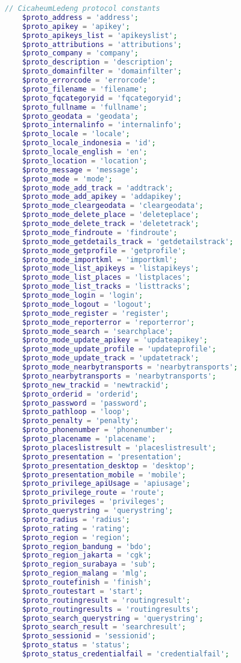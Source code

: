 \begin{lstlisting}[language=PHP,basicstyle=\tiny,caption=constants.php,label={lst:constants.php}]
	// CicaheumLedeng protocol constants
	$proto_address = 'address';
	$proto_apikey = 'apikey';
	$proto_apikeys_list = 'apikeyslist';
	$proto_attributions = 'attributions';	
	$proto_company = 'company';
	$proto_description = 'description';
	$proto_domainfilter = 'domainfilter';
	$proto_errorcode = 'errorcode';
	$proto_filename = 'filename';
	$proto_fqcategoryid = 'fqcategoryid';
	$proto_fullname = 'fullname';
	$proto_geodata = 'geodata';
	$proto_internalinfo = 'internalinfo';
	$proto_locale = 'locale';
	$proto_locale_indonesia = 'id';
	$proto_locale_english = 'en';
	$proto_location = 'location';
	$proto_message = 'message';
	$proto_mode = 'mode';
	$proto_mode_add_track = 'addtrack';
	$proto_mode_add_apikey = 'addapikey';
	$proto_mode_cleargeodata = 'cleargeodata';
	$proto_mode_delete_place = 'deleteplace';
	$proto_mode_delete_track = 'deletetrack';
	$proto_mode_findroute = 'findroute';
	$proto_mode_getdetails_track = 'getdetailstrack';
	$proto_mode_getprofile = 'getprofile';
	$proto_mode_importkml = 'importkml';
	$proto_mode_list_apikeys = 'listapikeys';
	$proto_mode_list_places = 'listplaces';
	$proto_mode_list_tracks = 'listtracks';
	$proto_mode_login = 'login';
	$proto_mode_logout = 'logout';
	$proto_mode_register = 'register';
	$proto_mode_reporterror = 'reporterror';
	$proto_mode_search = 'searchplace';
	$proto_mode_update_apikey = 'updateapikey';
	$proto_mode_update_profile = 'updateprofile';
	$proto_mode_update_track = 'updatetrack';
	$proto_mode_nearbytransports = 'nearbytransports';
	$proto_nearbytransports = 'nearbytransports';
	$proto_new_trackid = 'newtrackid';
	$proto_orderid = 'orderid';
	$proto_password = 'password';
	$proto_pathloop = 'loop';
	$proto_penalty = 'penalty';
	$proto_phonenumber = 'phonenumber';
	$proto_placename = 'placename';
	$proto_placeslistresult = 'placeslistresult';
	$proto_presentation = 'presentation';
	$proto_presentation_desktop = 'desktop';
	$proto_presentation_mobile = 'mobile';
	$proto_privilege_apiUsage = 'apiusage';
	$proto_privilege_route = 'route';
	$proto_privileges = 'privileges';
	$proto_querystring = 'querystring';
	$proto_radius = 'radius';
	$proto_rating = 'rating';
	$proto_region = 'region';
	$proto_region_bandung = 'bdo';
	$proto_region_jakarta = 'cgk';
	$proto_region_surabaya = 'sub';
	$proto_region_malang = 'mlg';
	$proto_routefinish = 'finish';
	$proto_routestart = 'start';
	$proto_routingresult = 'routingresult';
	$proto_routingresults = 'routingresults';
	$proto_search_querystring = 'querystring';
	$proto_search_result = 'searchresult';
	$proto_sessionid = 'sessionid';
	$proto_status = 'status';
	$proto_status_credentialfail = 'credentialfail';

\end{lstlisting}
